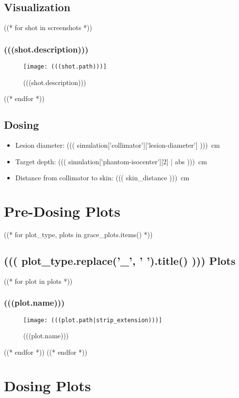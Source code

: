 \documentclass[12pt]{article}
\begin{document}
\subsection{Visualization}
((* for shot in screenshots *))
	\subsubsection{(((shot.description)))}
	\begin{figure}[H]
	\centering
	\texttt{[image: (((shot.path)))]}
	\caption{(((shot.description)))}
	\end{figure}
((* endfor *))

\subsection{Dosing}
\begin{itemize}
	\item Lesion diameter: \SI{((( simulation['collimator']['lesion-diameter']  )))}{\cm}
	\item Target depth: \SI{((( simulation['phantom-isocenter'][2] | abs )))}{\cm}
	\item Distance from collimator to skin: \SI{((( skin_distance )))}{\cm}
\end{itemize}

\section{Pre-Dosing Plots}
((* for plot_type, plots in grace_plots.items() *))
	\subsection{((( plot_type.replace('_', ' ').title() ))) Plots}
		((* for plot in plots *))
			\subsubsection{(((plot.name)))}
			\begin{figure}[H]
			\centering
			\texttt{[image: (((plot.path|strip\_extension)))]}
			\caption{(((plot.name)))}
			\label{fig:(((plot.slug)))}
			\end{figure}
		((* endfor *))
((* endfor *))

\section{Dosing Plots}
\end{document}
